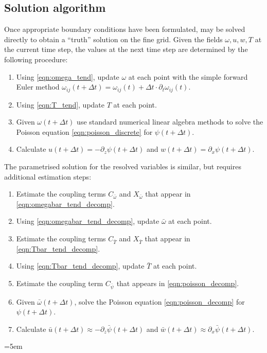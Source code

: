 \documentclass{article}
\begin{document}
\subsection{Solution algorithm}
Once appropriate boundary conditions have been formulated,
 may be solved
directly to obtain a ``truth'' solution on the fine grid. Given the fields
$\omega,u,w,T$ at the current time step, the values at the next time step
are determined by the following procedure:
\begin{enumerate}
    \item Using \autoref{eqn:omega_tend}, update $\omega$ at each point
        with the simple forward Euler method
        $\omega_{ij}(t+\Delta t) = \omega_{ij}(t)
        + \Delta t \cdot \partial_t \omega_{ij}(t)$.
    \item Using \autoref{eqn:T_tend}, update $T$ at each point.
    \item Given $\omega(t+\Delta t)$ use standard numerical linear algebra
        methods to solve the Poisson equation \autoref{eqn:poisson_discrete}
        for $\psi(t+\Delta t)$.
    \item Calculate $u(t+\Delta t) = -\partial_z \psi(t+\Delta t)$
        and $w(t+\Delta t) = \partial_x \psi(t+\Delta t)$.
\end{enumerate}

The parametrised solution for the resolved variables is similar, but
requires additional estimation steps:
\begin{enumerate}
    \item Estimate the coupling terms $C_{\bar{\omega}}$ and $X_{\bar{\omega}}$
        that appear in \autoref{eqn:omegabar_tend_decomp}.
    \item Using \autoref{eqn:omegabar_tend_decomp}, update $\bar{\omega}$
        at each point.
    \item Estimate the coupling terms $C_{\bar{T}}$ and $X_{\bar{T}}$
        that appear in \autoref{eqn:Tbar_tend_decomp}.
    \item Using \autoref{eqn:Tbar_tend_decomp}, update $\bar{T}$ at each point.
    \item Estimate the coupling term $C_{\bar{\psi}}$
        that appears in \autoref{eqn:poisson_decomp}.
    \item Given $\bar{\omega}(t+\Delta t)$, solve the Poisson equation
        \autoref{eqn:poisson_decomp} for $\psi(t+\Delta t)$.
    \item Calculate
        $\bar{u}(t+\Delta t) \approx -\partial_z \bar{\psi}(t+\Delta t)$
        and $\bar{w}(t+\Delta t) \approx \partial_x \bar{\psi}(t+\Delta t)$.
\end{enumerate}

\emergencystretch=5em
\printbibliography
\end{document}
